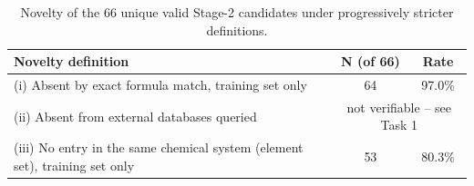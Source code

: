\begin{table}[htbp]
\centering
\caption{Novelty of the 66 unique valid Stage-2 candidates under progressively stricter definitions.}
\label{tab:a3_novelty_levels}
\begin{tabular}{lcc}
\toprule
Novelty definition & N (of 66) & Rate \\
\midrule
(i) Absent by exact formula match, training set only & 64 & 97.0\% \\
(ii) Absent from external databases queried & \multicolumn{2}{c}{not verifiable -- see Task 1} \\
(iii) No entry in the same chemical system (element set), training set only & 53 & 80.3\% \\
\bottomrule
\end{tabular}
\end{table}
